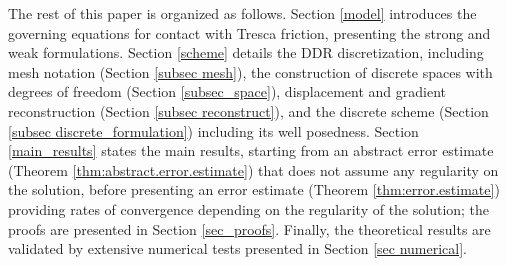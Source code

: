 \documentclass[a4paper,11pt]{article}
\theoremstyle{definition}
\theoremstyle{remark}
\begin{document}
The rest of this paper is organized as follows. Section \ref{model} introduces the governing equations for contact with Tresca friction, presenting the strong and weak formulations. Section \ref{scheme} details the DDR discretization, including mesh notation (Section \ref{subsec mesh}), the construction of discrete spaces with degrees of freedom (Section \ref{subsec_space}), displacement and gradient reconstruction (Section \ref{subsec reconstruct}), and the discrete scheme (Section \ref{subsec discrete_formulation}) including its well posedness. Section \ref{main_results} states the main results, starting from an abstract error estimate (Theorem \ref{thm:abstract.error.estimate}) that does not assume any regularity on the solution, before presenting an error estimate (Theorem \ref{thm:error.estimate}) providing rates of convergence depending on the regularity of the solution; the proofs are presented in Section \ref{sec_proofs}. Finally, the theoretical results are validated by extensive numerical tests presented in Section \ref{sec numerical}.

\end{document}
